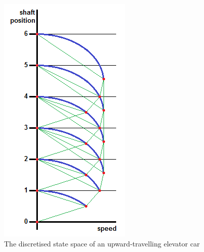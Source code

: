 \documentclass{UoYCSproject}
\begin{document}
\begin{figure} [h]
	\centering
	\includegraphics{shaft_state_space.png}
	\caption{The discretised state space of an upward-travelling elevator car}
	\label{shaftstates}
\end{figure}
\end{document}
